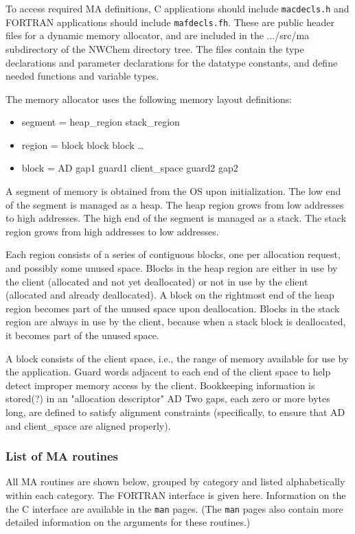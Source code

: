 To access required MA definitions, C applications should include
{\tt macdecls.h} and FORTRAN applications should include
{\tt mafdecls.fh}.  These are public header files for a dynamic memory 
allocator, and are included in the .../src/ma subdirectory of the
NWChem directory tree.  The files contain the type declarations
and parameter declarations for the datatype constants, and define
needed functions and variable types.

The memory allocator uses the following memory layout definitions:
\begin{itemize}
\item segment = heap\_region stack\_region
\item region = block block block \ldots
\item block = AD gap1 guard1 client\_space guard2 gap2
\end{itemize}

A segment of memory is obtained from the OS upon initialization.  The
low end of the segment is managed as a heap.  The heap region grows
from low addresses to high addresses.  The high end of the segment is
managed as a stack. The stack region grows from high addresses to low
addresses.

Each region consists of a series of contiguous blocks, one per
allocation request, and possibly some unused space.  Blocks in the
heap region are either in use by the client (allocated and not yet
deallocated) or not in use by the client (allocated and already
deallocated).  A block on the rightmost end of the heap region becomes
part of the unused space upon deallocation.  Blocks in the stack
region are always in use by the client, because when a stack block is
deallocated, it becomes part of the unused space.

A block consists of the client space, i.e., the range of memory
available for use by the application.  Guard words adjacent to each end
of the client space to help detect improper memory access by the
client.  Bookkeeping information is stored(?) in an "allocation descriptor" AD
Two gaps, each zero or more bytes long, are defined to satisfy alignment constraints
(specifically, to ensure that AD and client\_space are aligned
properly).  



\subsubsection{List of MA routines}

All MA routines are shown below, grouped by category and listed
alphabetically within each category.  The FORTRAN interface is given
here.  Information on the the C interface are available in the \verb+man+ pages.
(The \verb+man+ pages also contain more
detailed information on the
arguments for these routines.)

